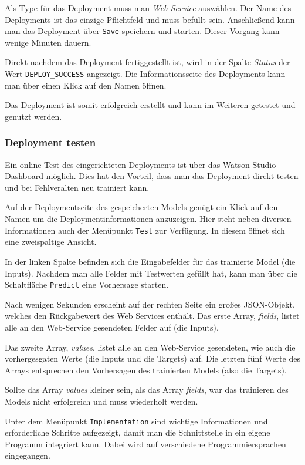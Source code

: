 Als Type für das Deployment muss man \textit{Web Service} auswählen. Der Name des Deployments ist das einzige Pflichtfeld
und muss befüllt sein. Anschließend kann man das Deployment über \texttt{Save} speichern und starten. Dieser Vorgang kann
wenige Minuten dauern.

Direkt nachdem das Deployment fertiggestellt ist, wird in der Spalte \textit{Status} der Wert \texttt{DEPLOY\_SUCCESS}
angezeigt. Die Informationsseite des Deployments kann man über einen Klick auf den Namen öffnen.

Das Deployment ist somit erfolgreich erstellt und kann im Weiteren getestet und genutzt werden.

\subsubsection{Deployment testen}
Ein online Test des eingerichteten Deployments ist über das Watson Studio Dashboard möglich. Dies hat den Vorteil, dass
man das Deployment direkt testen und bei Fehlveralten neu trainiert kann.

Auf der Deploymentseite des gespeicherten Models genügt ein Klick auf den Namen um die Deploymentinformationen anzuzeigen.
Hier steht neben diversen Informationen auch der Menüpunkt \texttt{Test} zur Verfügung. In diesem öffnet sich eine
zweispaltige Ansicht.

In der linken Spalte befinden sich die Eingabefelder für das trainierte Model (die Inputs). Nachdem man alle Felder mit
Testwerten gefüllt hat, kann man über die Schaltfläche \texttt{Predict} eine Vorhersage starten.

Nach wenigen Sekunden erscheint auf der rechten Seite ein großes JSON-Objekt, welches den Rückgabewert des Web Services
enthält. Das erste Array, \textit{fields}, listet alle an den Web-Service gesendeten Felder auf (die Inputs).

Das zweite Array, \textit{values}, listet alle an den Web-Service gesendeten, wie auch die vorhergesgaten Werte (die
Inputs und die Targets) auf. Die letzten fünf Werte des Arrays entsprechen den Vorhersagen des trainierten Models (also
die Targets).

Sollte das Array \textit{values} kleiner sein, als das Array \textit{fields}, war das trainieren des Models nicht
erfolgreich und muss wiederholt werden.

Unter dem Menüpunkt \texttt{Implementation} sind wichtige Informationen und erforderliche Schritte aufgezeigt, damit
man die Schnittstelle in ein eigene Programm integriert kann. Dabei wird auf verschiedene Programmiersprachen eingegangen.

